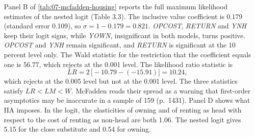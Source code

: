 Panel B of \cref{tab:07-mcfadden-housing} reports the full maximum likelihood estimates of the nested logit
(Table 3.3). The inclusive value coefficient is 0.179 (standard error 0.109), so $\sigma = 1 - 0.179 = 0.821$.
\textit{OPCOST}, \textit{RETURN} and \textit{YNH} keep their logit signs, while \textit{YOWN}, insignificant in
both models, turns positive. \textit{OPCOST} and \textit{YNH} remain significant, and \textit{RETURN} is
significant at the 10 percent level only. The Wald statistic for the restriction that the
coefficient equals one is 56.77, which rejects at the 0.001 level. The likelihood ratio statistic is
\begin{equation*}
  LR = 2\,\big[-10.79 - (-15.91)\big] = 10.24 ,
\end{equation*}
which rejects at the 0.005 level but not at the 0.001 level. The three statistics satisfy $LR < LM < W$.
McFadden reads their spread as a warning that first-order asymptotics may be inaccurate in a sample of 159
(p.~1431). Panel D shows what IIA imposes. In the logit, the elasticities of owning and of renting as head with
respect to the cost of renting as non-head are both 1.06. The nested logit gives 5.15 for the close substitute
and 0.54 for owning.

